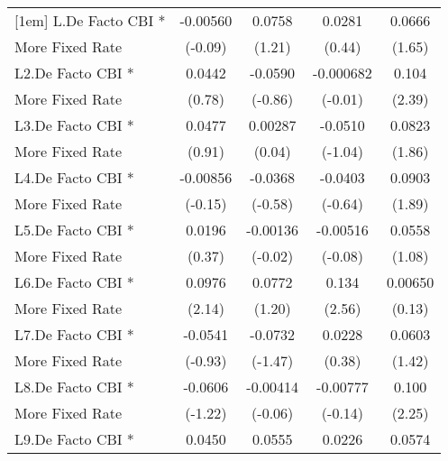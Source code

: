 {\begin{tabular}{l*{4}{c}}
[1em]
L.De Facto CBI *    &    -0.00560         &      0.0758         &      0.0281         &      0.0666         \\
More Fixed Rate     &     (-0.09)         &      (1.21)         &      (0.44)         &      (1.65)         \\
[1em]
L2.De Facto CBI *   &      0.0442         &     -0.0590         &   -0.000682         &       0.104\sym{*}  \\
More Fixed Rate     &      (0.78)         &     (-0.86)         &     (-0.01)         &      (2.39)         \\
[1em]
L3.De Facto CBI *   &      0.0477         &     0.00287         &     -0.0510         &      0.0823         \\
More Fixed Rate     &      (0.91)         &      (0.04)         &     (-1.04)         &      (1.86)         \\
[1em]
L4.De Facto CBI *   &    -0.00856         &     -0.0368         &     -0.0403         &      0.0903         \\
More Fixed Rate     &     (-0.15)         &     (-0.58)         &     (-0.64)         &      (1.89)         \\
[1em]
L5.De Facto CBI *   &      0.0196         &    -0.00136         &    -0.00516         &      0.0558         \\
More Fixed Rate     &      (0.37)         &     (-0.02)         &     (-0.08)         &      (1.08)         \\
[1em]
L6.De Facto CBI *   &      0.0976\sym{*}  &      0.0772         &       0.134\sym{*}  &     0.00650         \\
More Fixed Rate     &      (2.14)         &      (1.20)         &      (2.56)         &      (0.13)         \\
[1em]
L7.De Facto CBI *   &     -0.0541         &     -0.0732         &      0.0228         &      0.0603         \\
More Fixed Rate     &     (-0.93)         &     (-1.47)         &      (0.38)         &      (1.42)         \\
[1em]
L8.De Facto CBI *   &     -0.0606         &    -0.00414         &    -0.00777         &       0.100\sym{*}  \\
More Fixed Rate     &     (-1.22)         &     (-0.06)         &     (-0.14)         &      (2.25)         \\
[1em]
L9.De Facto CBI *   &      0.0450         &      0.0555         &      0.0226         &      0.0574         \\

\end{tabular}}

